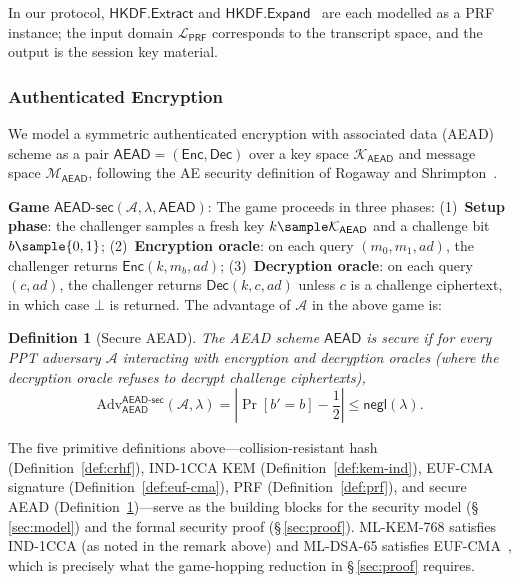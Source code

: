 \documentclass[runningheads]{llncs}
\newtheorem{defn}{Definition}[]
\newcommand{\negli}{\mathsf{negl}}
\begin{document}
In our protocol, $\mathsf{HKDF.Extract}$ and $\mathsf{HKDF.Expand}$~\cite{RFC5869} are each modelled as a PRF instance; the input domain $\mathcal{L}_{\mathsf{PRF}}$ corresponds to the transcript space, and the output is the session key material.

\subsubsection{Authenticated Encryption}

We model a symmetric authenticated encryption with associated data (AEAD) scheme as a pair $\mathsf{AEAD} = (\mathsf{Enc}, \mathsf{Dec})$ over a key space $\mathcal{K}_\mathsf{AEAD}$ and message space $\mathcal{M}_\mathsf{AEAD}$, following the AE security definition of Rogaway and Shrimpton~\cite{EC:RogShr06}.

\noindent\textbf{Game} $\mathsf{AEAD\text{-}sec}(\mathcal{A}, \lambda, \mathsf{AEAD})$:
The game proceeds in three phases: (1)~\textbf{Setup phase}: the challenger samples a fresh key $k \sample \mathcal{K}_\mathsf{AEAD}$ and a challenge bit $b \sample \{0,1\}$; (2)~\textbf{Encryption oracle}: on each query $(m_0, m_1, \mathit{ad})$, the challenger returns $\mathsf{Enc}(k, m_b, \mathit{ad})$; (3)~\textbf{Decryption oracle}: on each query $(c, \mathit{ad})$, the challenger returns $\mathsf{Dec}(k, c, \mathit{ad})$ unless $c$ is a challenge ciphertext, in which case $\bot$ is returned.
The advantage of $\mathcal{A}$ in the above game is:

\begin{defn}[Secure AEAD] \label{def:aead}
The AEAD scheme $\mathsf{AEAD}$ is secure if for every PPT adversary $\mathcal{A}$ interacting with encryption and decryption oracles (where the decryption oracle refuses to decrypt challenge ciphertexts),
$$
\mathrm{Adv}_{\mathsf{AEAD}}^{\mathsf{AEAD}\text{-}\mathsf{sec}}(\mathcal{A}, \lambda) = \left| \Pr\left[b' = b\right] - \frac{1}{2} \right| \leq \negli(\lambda).
$$
\end{defn}

The five primitive definitions above---collision-resistant hash (Definition~\ref{def:crhf}), IND-1CCA KEM (Definition~\ref{def:kem-ind}), EUF-CMA signature (Definition~\ref{def:euf-cma}), PRF (Definition~\ref{def:prf}), and secure AEAD (Definition~\ref{def:aead})---serve as the building blocks for the security model (§\,\ref{sec:model}) and the formal security proof (§\,\ref{sec:proof}).
ML-KEM-768 satisfies IND-1CCA (as noted in the remark above) and ML-DSA-65 satisfies EUF-CMA~\cite{TCHES:DKLLSSS18}, which is precisely what the game-hopping reduction in §\,\ref{sec:proof} requires.
\end{document}
